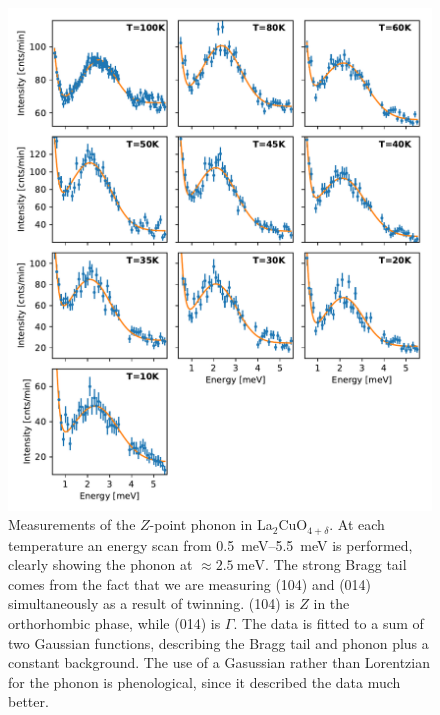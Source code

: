 \begin{figure}
    \centering
    \includegraphics[width=\textwidth]{fig/lowen/lcoo_phonon_fits.pdf}
    \caption[lco+o Z-point phonon fits]{Measurements of the $Z$-point phonon in La$_2$CuO$_{4+\delta}$. At each temperature an energy scan from \SIrange{0.5}{5.5}{\milli\eV} is performed, clearly showing the phonon at $\approx \SI{2.5}{\milli\eV}$. The strong Bragg tail comes from the fact that we are measuring (104) and (014) simultaneously as a result of twinning. (104) is $Z$ in the orthorhombic phase, while (014) is $\Gamma$. The data is fitted to a sum of two Gaussian functions, describing the Bragg tail and phonon plus a constant background. The use of a Gasussian rather than Lorentzian for the phonon is phenological, since it described the data much better.}
    \label{fig:lcoo_zpoint_phonon_fits}
\end{figure}

